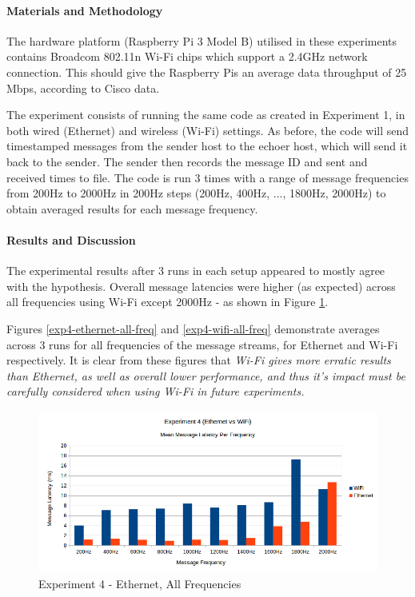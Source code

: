 \documentclass[../dissertation.tex]{subfiles}
\begin{document}
\paragraph{Materials and Methodology} The hardware platform (Raspberry Pi 3 Model B) utilised in these experiments contains Broadcom 802.11n Wi-Fi chips which support a 2.4GHz network connection. This should give the Raspberry Pis an average data throughput of 25 Mbps, according to Cisco data\cite{florwick2013wireless}.

The experiment consists of running the same code as created in Experiment 1\cite{Experiment1NoEchoDelayCode}, in both wired (Ethernet) and wireless (Wi-Fi) settings. As before, the code will send timestamped messages from the sender host to the echoer host, which will send it back to the sender. The sender then records the message ID and sent and received times to file. The code is run 3 times with a range of message frequencies from 200Hz to 2000Hz in 200Hz steps (200Hz, 400Hz, ..., 1800Hz, 2000Hz) to obtain averaged results for each message frequency.

\paragraph{Results and Discussion} The experimental results after 3 runs in each setup appeared to mostly agree with the hypothesis. Overall message latencies were higher (as expected) across all frequencies using Wi-Fi except 2000Hz - as shown in Figure \ref{exp4-means-all-freq}.

Figures \ref{exp4-ethernet-all-freq} and \ref{exp4-wifi-all-freq} demonstrate averages across 3 runs for all frequencies of the message streams, for Ethernet and Wi-Fi respectively. It is clear from these figures that \textit{Wi-Fi gives more erratic results than Ethernet, as well as overall lower performance, and thus it's impact must be carefully considered when using Wi-Fi in future experiments.}

\begin{figure}[H]
\centering
\includegraphics[width=\textwidth]{images/experiment4/mean_per_frequency.png}
\caption{Experiment 4 - Ethernet, All Frequencies}
\label{exp4-means-all-freq}
\end{figure}
\end{document}
